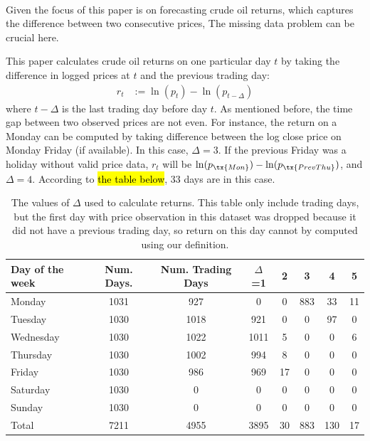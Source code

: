 \documentclass[12pt]{article}
\begin{document}
	\paragraph{} Given the focus of this paper is on forecasting crude oil returns, which captures the difference between two consecutive prices, The missing data problem can be crucial here.

	\par This paper calculates crude oil returns on one particular day $t$ by taking the difference in logged prices at $t$ and the previous trading day:
	\begin{align}
		r_t &:= \ln(p_t) - \ln(p_{t - \Delta})
	\end{align}
	where $t - \Delta$ is the last trading day before day $t$. As mentioned before, the time gap between two observed prices are not even. For instance, the return on a Monday can be computed by taking difference between the log close price on Monday Friday (if available). In this case, $\Delta = 3$. If the previous Friday was a holiday without valid price data, $r_t$ will be $\ln(p_\tx{Mon}) - \ln(p_{\tx{Prev Thu}})$, and $\Delta = 4$. According to \hl{the table below}, 33 days are in this case.
	\begin{table}[H]
		\centering
		\small
		\begin{tabular}{l|c c c c c c c}
			\toprule
			Day of the week & Num. Days. & Num. Trading Days & $\Delta$=1 & 2 & 3 & 4 & 5 \\
			\midrule
			Monday & 1031 & 927 & 0 & 0 & 883 & 33 & 11 \\
			Tuesday & 1030 & 1018 & 921 & 0 & 0 & 97 & 0 \\
			Wednesday & 1030 & 1022 & 1011 & 5 & 0 & 0 & 6 \\
			Thursday & 1030 & 1002 & 994 & 8 & 0 & 0 & 0 \\
			Friday & 1030 & 986 & 969 & 17 & 0 & 0 & 0 \\
			Saturday & 1030 & 0 & 0 & 0 & 0 & 0 & 0 \\
			Sunday & 1030 & 0 & 0 & 0 & 0 & 0 & 0 \\
			\midrule
			Total & 7211 & 4955 & 3895 & 30 & 883 & 130 & 17 \\
			\bottomrule
		\end{tabular}
		\caption{The values of $\Delta$ used to calculate returns. This table only include trading days, but the first day with price observation in this dataset was dropped because it did not have a previous trading day, so return on this day cannot by computed using our definition.}
	\end{table}
\end{document}

